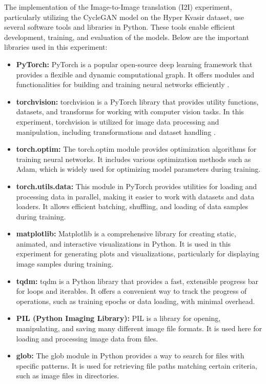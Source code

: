 \documentclass[UKenglish,12pt]{master-style}
\begin{document}
The implementation of the Image-to-Image translation (I2I) experiment, particularly utilizing the CycleGAN model on the Hyper Kvasir dataset, use several software tools and libraries in Python. These tools enable efficient development, training, and evaluation of the models. Below are the important libraries used in this experiment:
\begin{itemize}

\item \textbf{PyTorch: }PyTorch is a popular open-source deep learning framework that provides a flexible and dynamic computational graph. It offers modules and functionalities for building and training neural networks efficiently \cite{PyTorch_horse2zebra}.

\item \textbf{torchvision:} torchvision is a PyTorch library that provides utility functions, datasets, and transforms for working with computer vision tasks. In this experiment, torchvision is utilized for image data processing and manipulation, including transformations and dataset handling \cite{PyTorch_horse2zebra}.

\item \textbf{torch.optim: }The torch.optim module provides optimization algorithms for training neural networks. It includes various optimization methods such as Adam, which is widely used for optimizing model parameters during training.

\item \textbf{torch.utils.data:} This module in PyTorch provides utilities for loading and processing data in parallel, making it easier to work with datasets and data loaders. It allows efficient batching, shuffling, and loading of data samples during training.

\item \textbf{matplotlib: }Matplotlib is a comprehensive library for creating static, animated, and interactive visualizations in Python. It is used in this experiment for generating plots and visualizations, particularly for displaying image samples during training.

\item \textbf{tqdm: }tqdm is a Python library that provides a fast, extensible progress bar for loops and iterables. It offers a convenient way to track the progress of operations, such as training epochs or data loading, with minimal overhead.

\item \textbf{PIL (Python Imaging Library):} PIL is a library for opening, manipulating, and saving many different image file formats. It is used here for loading and processing image data from files.

\item \textbf{glob: }The glob module in Python provides a way to search for files with specific patterns. It is used for retrieving file paths matching certain criteria, such as image files in directories.
\end{itemize}
\end{document}
